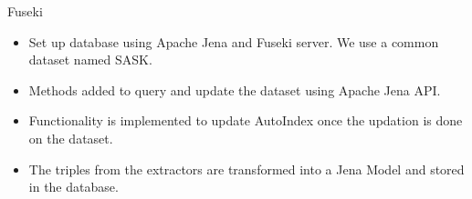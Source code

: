 \begin{frame}{Fuseki}
	\begin{itemize}
		\item Set up database using Apache Jena and Fuseki server. We use a common dataset named SASK.
		
		\item Methods added to query and update the dataset using Apache Jena API.
		
		\item Functionality is implemented to update AutoIndex once the updation is done on the dataset.
		
		\item The triples from the extractors are transformed into a Jena Model and stored in the database.
	\end{itemize}
\end{frame}
